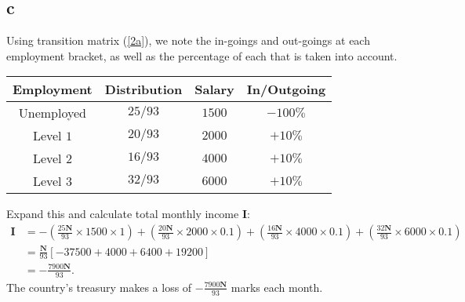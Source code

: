\documentclass{article}
\begin{document}
\subsection{c}
Using transition matrix (\ref{2a}), we note the in-goings and out-goings at each employment bracket, as well as the percentage of each that is taken into account.
\begin{table}[H]
    \centering
    \begin{tabular}{|c|c|c|c|}
    \hline
        Employment & Distribution & Salary & In/Outgoing \\
        \hline
        Unemployed & $25/93$ & $1500$ & $-100\%$ \\
        Level $1$ & $20/93$ & $2000$ & $+10\%$ \\
        Level $2$ & $16/93$ & $4000$ & $+10\%$ \\
        Level $3$ & $32/93$ & $6000$ & $+10\%$ \\
        \hline
    \end{tabular}
    \label{2c}
\end{table}
Expand this and calculate total monthly income $\mathbf{I}$:
\begin{align}
    \mathbf{I} &= -\left( \frac{25\mathbf{N}}{93}\times 1500\times 1 \right) + \left( \frac{20\mathbf{N}}{93}\times 2000\times 0.1 \right) + \left( \frac{16\mathbf{N}}{93}\times 4000\times 0.1 \right) + \left( \frac{32\mathbf{N}}{93}\times 6000\times 0.1 \right) \\
    &= \frac{\mathbf{N}}{93}\left[ -37500 + 4000 + 6400 + 19200 \right]\\
    &= -\frac{7900\mathbf{N}}{93}.
\end{align}
The country's treasury makes a loss of $-\frac{7900\mathbf{N}}{93}$ marks each month.
\end{document}
